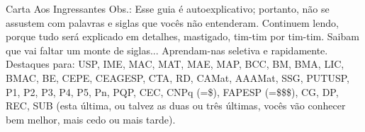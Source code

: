 \begin{editorial}{Carta Aos Ingressantes}
Obs.: Esse guia é autoexplicativo; portanto, não se assustem com palavras e
siglas que vocês não entenderam. Continuem lendo, porque tudo será explicado em
detalhes, mastigado, tim-tim por tim-tim. Saibam que vai faltar um monte de
siglas...  Aprendam-nas seletiva e rapidamente. Destaques para: USP, IME, MAC,
MAT, MAE, MAP, BCC, BM, BMA, LIC, BMAC, BE, CEPE, CEAGESP, CTA, RD, CAMat,
AAAMat, SSG, PUTUSP, P1, P2, P3, P4, P5, Pn, PQP, CEC, CNPq (=\$), FAPESP
(=\$\$\$), CG, DP, REC, SUB (esta última, ou talvez as duas ou três últimas,
vocês vão conhecer bem melhor, mais cedo ou mais tarde).

\end{editorial}

